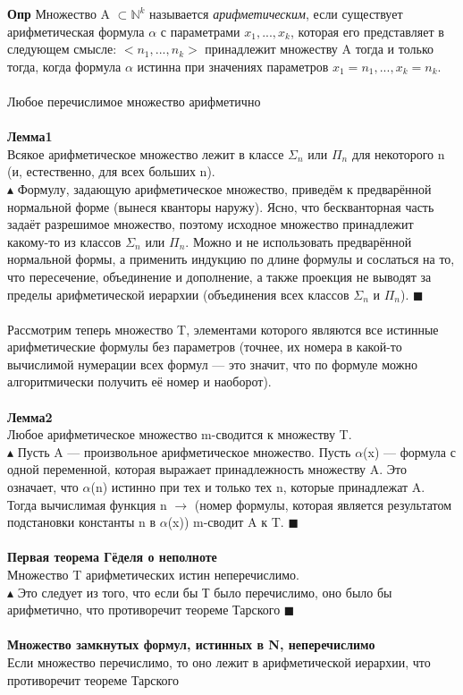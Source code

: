 \textbf{Опр} Множество A $\subset \mathbb{N}^k$ называется \textit{арифметическим}, если существует арифметическая формула $\alpha$ с параметрами $x_1, . . . , x_k$, которая его представляет в следующем смысле: $<n_1, . . . , n_k>$ принадлежит множеству A тогда и только тогда, когда формула $\alpha$ истинна при значениях параметров $x_1 = n_1, . . . , x_k = n_k$.
\\
\\
Любое перечислимое множество арифметично
\\
\\
\textbf{Лемма1}\\
Всякое арифметическое множество лежит в классе $\Sigma_n$ или $\Pi_n$ для некоторого n (и, естественно, для всех больших n).
\\
$\blacktriangle$ Формулу, задающую арифметическое множество, приведём к предварённой нормальной форме (вынеся кванторы наружу). Ясно, что бескванторная часть задаёт разрешимое множество, поэтому исходное множество принадлежит какому-то из классов $\Sigma_n$ или $\Pi_n$. Можно и не использовать предварённой нормальной формы, а применить индукцию по длине формулы и сослаться на то, что пересечение, объединение и дополнение, а также проекция не выводят за пределы арифметической иерархии (объединения всех классов $\Sigma_n$ и $\Pi_n$). $\blacksquare$
\\
\\
Рассмотрим теперь множество T, элементами которого являются
все истинные арифметические формулы без параметров (точнее, их номера в какой-то вычислимой нумерации всех формул — это значит, что по формуле можно алгоритмически получить её номер и наоборот).
\\
\\
\textbf{Лемма2}\\ Любое арифметическое множество m-сводится к множеству T.\\
$\blacktriangle$ Пусть A — произвольное арифметическое множество. Пусть $\alpha$(x) — формула с одной переменной, которая выражает принадлежность множеству A. Это означает, что $\alpha$(n) истинно при тех и только тех n, которые принадлежат A.
Тогда вычислимая функция n $\rightarrow$ (номер формулы, которая является
результатом подстановки константы n в $\alpha$(x)) m-сводит A к T. $\blacksquare$
\\
\\
\textbf{ Первая теорема
Гёделя о неполноте}\\
Множество T арифметических истин неперечислимо.\\
$\blacktriangle$ Это следует из того, что если бы Т было перечислимо, оно было бы арифметично, что противоречит теореме Тарского $\blacksquare$ 
\\
\\
\textbf{Множество замкнутых формул, истинных в N, неперечислимо } \\
Если множество перечислимо, то оно лежит в арифметической иерархии, что противоречит теореме Тарского


